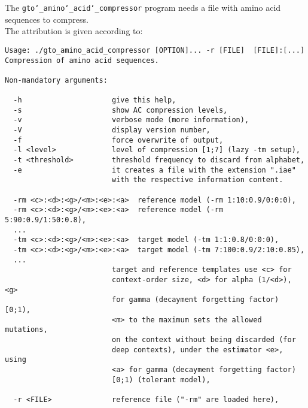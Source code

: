 The \texttt{gto\char`_amino\char`_acid\char`_compressor} program needs a file with amino acid sequences to compress.\\
The attribution is given according to:
\begin{lstlisting}
Usage: ./gto_amino_acid_compressor [OPTION]... -r [FILE]  [FILE]:[...]                          
Compression of amino acid sequences.                                   
                                                                       
Non-mandatory arguments:                                               
                                                                       
  -h                     give this help,                               
  -s                     show AC compression levels,                   
  -v                     verbose mode (more information),              
  -V                     display version number,                       
  -f                     force overwrite of output,                    
  -l <level>             level of compression [1;7] (lazy -tm setup),  
  -t <threshold>         threshold frequency to discard from alphabet,
  -e                     it creates a file with the extension ".iae" 
                         with the respective information content.      
                                                                       
  -rm <c>:<d>:<g>/<m>:<e>:<a>  reference model (-rm 1:10:0.9/0:0:0),   
  -rm <c>:<d>:<g>/<m>:<e>:<a>  reference model (-rm 5:90:0.9/1:50:0.8),
  ...                                                                  
  -tm <c>:<d>:<g>/<m>:<e>:<a>  target model (-tm 1:1:0.8/0:0:0),       
  -tm <c>:<d>:<g>/<m>:<e>:<a>  target model (-tm 7:100:0.9/2:10:0.85), 
  ...                                                                  
                         target and reference templates use <c> for    
                         context-order size, <d> for alpha (1/<d>), <g>
                         for gamma (decayment forgetting factor) [0;1),
                         <m> to the maximum sets the allowed mutations,
                         on the context without being discarded (for   
                         deep contexts), under the estimator <e>, using
                         <a> for gamma (decayment forgetting factor)   
                         [0;1) (tolerant model),                       
                                                                       
  -r <FILE>              reference file ("-rm" are loaded here),     
                                                                       

\end{lstlisting}
